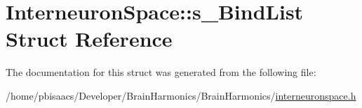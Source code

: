 \hypertarget{structInterneuronSpace_1_1s__BindList}{}\section{Interneuron\+Space\+:\+:s\+\_\+\+Bind\+List Struct Reference}
\label{structInterneuronSpace_1_1s__BindList}


The documentation for this struct was generated from the following file\+:\begin{DoxyCompactItemize}
\item 
/home/pbisaacs/\+Developer/\+Brain\+Harmonics/\+Brain\+Harmonics/\mbox{\hyperlink{interneuronspace_8h}{interneuronspace.\+h}}\end{DoxyCompactItemize}
